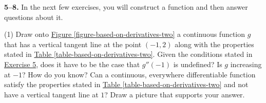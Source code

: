 \documentclass[10pt,oneside,]{book}
\theoremstyle{plain}
\theoremstyle{definition}
\numberwithin{equation}{section}
\newcommand{\hrulemedium}{\noalign{\hrule height 0.07em}}
\newcommand{\hrulethick} {\noalign{\hrule height 0.11em}}
\newcounter{figstack}
\newcounter{figindex}
\newlength\fight
\newcommand\pushValignCaptionBottom[5][b]{%
\stepcounter{figstack}%
\expandafter\def\csname %
figalign\romannumeral\value{figstack}\endcsname{#1}%
\expandafter\def\csname %
figtype\romannumeral\value{figstack}\endcsname{#2}%
\expandafter\def\csname %
figwd\romannumeral\value{figstack}\endcsname{#3}%
\expandafter\def\csname %
figcontent\romannumeral\value{figstack}\endcsname{#4}%
\expandafter\def\csname %
figcap\romannumeral\value{figstack}\endcsname{#5}%
\setbox0=\hbox{%
\begin{#2}{#3}#4\end{#2}}%
\ifdim\dimexpr\ht0+\dp0\relax>\fight\global\setlength{\fight}{%
\dimexpr\ht0+\dp0\relax}\fi%
}
\newcommand\popValignCaptionBottom{%
\setcounter{figindex}{0}%
\hfill%
\whiledo{\value{figindex}<\value{figstack}}{%
\stepcounter{figindex}%
\def\tmp{\csname figwd\romannumeral\value{figindex}\endcsname}%
\begin{\csname figtype\romannumeral\value{figindex}\endcsname}[t]{\tmp}%
\centering%
\stackinset{c}{}%
{\csname figalign\romannumeral\value{figindex}\endcsname}{}%
{\csname figcontent\romannumeral\value{figindex}\endcsname}%
{\rule{0pt}{\fight}}\par%
\csname figcap\romannumeral\value{figindex}\endcsname%
\end{\csname figtype\romannumeral\value{figindex}\endcsname}%
\hfill%
}%
\setcounter{figstack}{0}%
\setlength{\fight}{0pt}%
\hfill%
}
\newcommand{\fe}[2]{#1\mathopen{}\left(#2\right)\mathclose{}}
\newcommand{\ointerval}[2]{\left(#1,#2\right)}
\newcommand{\point}[2]{\left(#1,#2\right)}
\newcommand{\fd}[1]{#1'}
\newcommand{\sd}[1]{#1''}
\begin{document}
\par\smallskip\noindent
\textbf{5--8. }\hypertarget{exercisegroup-58}{\null}In the next few exercises, you will construct a function and then answer questions about it.%
\par
\begin{exercisegroup}(1)
\exercise[5.]\hypertarget{exercise-based-on-derivatives-two}{\null}Draw onto \hyperref[figure-based-on-derivatives-two]{Figure \ref{figure-based-on-derivatives-two}} a continuous function \(g\) that has a vertical tangent line at the point \(\point{-1}{2}\) along with the properties stated in \hyperref[table-based-on-derivatives-two]{Table \ref{table-based-on-derivatives-two}}.%
\exercise[6.]\hypertarget{exercise-283}{\null}Given the conditions stated in \hyperlink{exercise-based-on-derivatives-two}{Exercise 5}, does it have to be the case that \(\fe{\sd{g}}{-1}\) is undefined?%
\exercise[7.]\hypertarget{exercise-284}{\null}Is \(g\) increasing at \(-1\)?  How do you know?%
\exercise[8.]\hypertarget{exercise-285}{\null}Can a continuous, everywhere differentiable function satisfy the properties stated in \hyperref[table-based-on-derivatives-two]{Table \ref{table-based-on-derivatives-two}} and not have a vertical tangent line at \(1\)?  Draw a picture that supports your answer.%
\end{exercisegroup}
\end{document}
